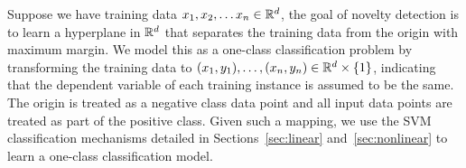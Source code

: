 Suppose we have training data $x_1, x_2, \ldots x_n \in \mathbb{R}^d$, the goal of
novelty detection is to learn a hyperplane in $\mathbb{R}^d$ that separates the training
data from the origin with maximum margin. We model this as a one-class
classification problem by transforming the training data to
$(x_1,y_1),\ldots,(x_n,y_n) \in \mathbb{R}^d\times \{1\}$, indicating that the dependent
variable of each training instance is assumed to be the same. The origin is
treated as a negative class data point and all input data points are treated as
part of the positive class. Given such a mapping, we use the SVM classification
mechanisms detailed in Sections~\ref{sec:linear} and~\ref{sec:nonlinear} to
learn a one-class classification model.
